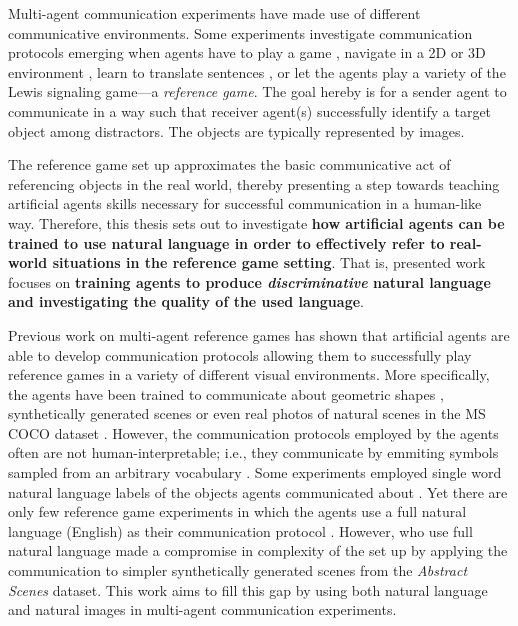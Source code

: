 Multi-agent communication experiments have made use of different communicative environments. Some experiments investigate communication protocols emerging when agents have to play a game \parencite{jacob2021multitasking}, navigate in a 2D or 3D environment \parencite{das2019tarmac, jaques2019social}, learn to translate sentences \parencite{lee2019countering}, or let the agents play a variety of the Lewis signaling game---a \textit{reference game}. The goal hereby is for a sender agent to communicate in a way such that receiver agent(s) successfully identify a target object among distractors. The objects are typically represented by images. 

The reference game set up approximates the basic communicative act of referencing objects in the real world, thereby presenting a step towards teaching artificial agents skills necessary for successful communication in a human-like way. 
Therefore, this thesis sets out to investigate \textbf{how artificial agents can be trained to use natural language in order to effectively refer to real-world situations in the reference game setting}. That is, presented work focuses on \textbf{training agents to produce \textit{discriminative} natural language and investigating the quality of the used language}. 

Previous work on multi-agent reference games has shown that artificial agents are able to develop communication protocols allowing them to successfully play reference games in a variety of different visual environments. More specifically, the agents have been trained to communicate about geometric shapes \parencite{ohmer2021and}, synthetically generated scenes \parencite{lazaridou2020multi} or even real photos of natural scenes in the MS COCO dataset \parencite{lazaridou2016multi, lin2014microsoft, havrylov2017emergence}. However, the communication protocols employed by the agents often are not human-interpretable; i.e., they communicate by emmiting symbols sampled from an arbitrary vocabulary \parencite{foerster2016learning, lazaridou2016multi}. Some experiments employed single word natural language labels of the objects agents communicated about \parencite{lazaridou2016multi}. Yet there are only few reference game experiments in which the agents use a full natural language (English) as their communication protocol \parencite[e. g.,][]{lazaridou2020multi}. However, \cite{lazaridou2020multi} who use full natural language made a compromise in complexity of the set up by applying the communication to simpler synthetically generated scenes from the \textit{Abstract Scenes} dataset. This work aims to fill this gap by using both natural language and natural images in multi-agent communication experiments. 

